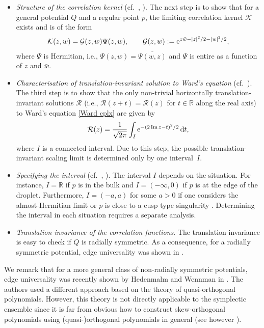 \documentclass[pdftex]{sigma}
\numberwithin{equation}{section}
\newcommand{\R}{{\mathbb R}}
\newcommand{\im}{\operatorname{Im}}
\newcommand{\1}{\chi}
\begin{document}
\begin{Remark}
\begin{itemize}
 \item \emph{Structure of the correlation kernel} (cf.\ \cite[Theorem~1.1]{MR3975882}, \cite[Theorem~1.3]{ameur2018random}). The next step is to show that for a general potential $Q$ and a regular point $p$, the limiting correlation kernel $\mathcal{K}$ exists and is of the form
 \begin{gather*}
 \mathcal{K}(z,w)=\mathcal{G}(z,w) \Psi(z,w), \qquad \mathcal{G}(z,w):={\rm e}^{z\bar{w}-|z|^2/2-|w|^2/2},
 \end{gather*}
 where $\Psi$ is Hermitian, i.e., $\Psi(z,w)=\overline{ \Psi(w,z) }$ and $\Psi$ is entire as a function of $z$ and $\bar{w}$.

 \item \emph{Characterisation of translation-invariant solution to Ward's equation} (cf.\ \cite[Theorem~4]{MR4030288}). The third step is to show that the only non-trivial horizontally translation-invariant solutions $\mathcal{R}$ (i.e., $\mathcal{R}(z+t)=\mathcal{R}(z)$ for $t \in \R$
 along the real axis) to Ward’s equation \eqref{Ward cplx} are given by
 \begin{gather*}
 \mathcal{R}(z)=\frac{1}{\sqrt{2\pi}} \int_I {\rm e}^{-(2 \im z-t)^2/2}\,{\rm d}t,
 \end{gather*}
 where $I$ is a connected interval. Due to this step, the possible translation-invariant scaling limit is determined only by one interval~$I$.

 \item \emph{Specifying the interval} (cf.\ \cite[Theorem~1.5]{MR3975882}, \cite[Theorem~3.8]{AB21}). The interval $I$ depends on the situation. For instance, $I=\R$ if $p$ is in the bulk \cite{MR2817648,MR3342661} and $I=(-\infty,0)$ if $p$ is at the edge \cite{MR3975882,hedenmalm2017planar} of the droplet. Furthermore, $I=(-a,a)$ for some $a>0$ if one considers the almost-Hermitian limit \cite{AB21} or $p$ is close to a cusp type singularity \cite{MR4030288}. Determining the interval in each situation requires a separate analysis.

 \item \emph{Translation invariance of the correlation functions}. The translation invariance is easy to check if $Q$ is radially symmetric. As a consequence, for a radially symmetric potential, edge universality was shown in \cite[Theorem~1.8]{MR3975882}.
\end{itemize}

We remark that for a more general class of non-radially symmetric potentials, edge universality was recently shown by Hedenmalm and Wennman in \cite{hedenmalm2017planar}.
The authors used a different approach based on the theory of quasi-orthogonal polynomials.
However, this theory is not directly applicable to the symplectic ensemble since it is far from obvious how to construct
skew-orthogonal polynomials using (quasi-)orthogonal polynomials in general
(see however \cite{akemann2021skew}).


\end{Remark}
\end{document}
